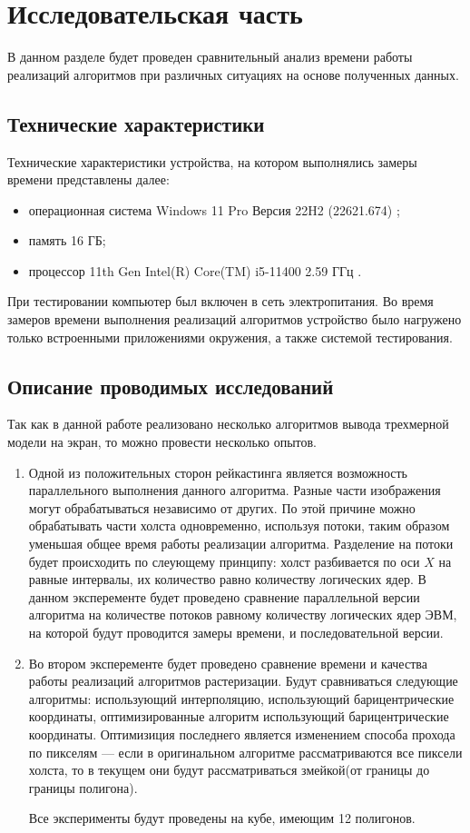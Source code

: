 \chapter{Исследовательская часть}

В данном разделе будет проведен сравнительный анализ времени работы реализаций алгоритмов при различных ситуациях на основе полученных данных.

\section{Технические характеристики}

Технические характеристики устройства, на котором выполнялись замеры времени представлены далее:

\begin{itemize}
	\item операционная система Windows 11 Pro Версия 22H2 (22621.674) \cite{wind};
	\item память 16 ГБ;
	\item процессор 11th Gen Intel(R) Core(TM) i5-11400 2.59 ГГц \cite{proc}.
\end{itemize}

При тестировании компьютер был включен в сеть электропитания. Во время замеров времени выполнения реализаций алгоритмов устройство было нагружено только встроенными приложениями окружения, а также системой тестирования.
\section{Описание проводимых исследований}
Так как в данной работе реализовано несколько алгоритмов вывода трехмерной модели на экран, то можно провести несколько опытов.  
\begin{enumerate}
\item Одной из положительных сторон рейкастинга является возможность параллельного выполнения данного алгоритма. Разные части изображения могут обрабатываться независимо от других. По
этой причине можно обрабатывать части холста одновременно, используя потоки,
таким образом уменьшая общее время работы реализации алгоритма.
Разделение на потоки будет происходить по слеующему принципу: холст разбивается по оси $X$ на равные интервалы, их количество равно количеству логических ядер. В данном эксперементе будет проведено сравнение параллельной версии алгоритма на количестве потоков равному количеству логических ядер ЭВМ, на которой будут проводится замеры времени, и последовательной версии.
\item Во втором эксперементе будет проведено сравнение времени и качества работы реализаций алгоритмов растеризации. Будут сравниваться следующие алгоритмы: использующий интерполяцию, использующий барицентрические координаты, оптимизированные алгоритм использующий барицентрические координаты. Оптимизиция последнего является изменением способа прохода по пикселям --- если в оригинальном алгоритме рассматриваются все пиксели холста, то в текущем они будут рассматриваться змейкой(от границы до границы полигона). 

Все эксперименты будут проведены на кубе, имеющим 12 полигонов.
\end{enumerate}
